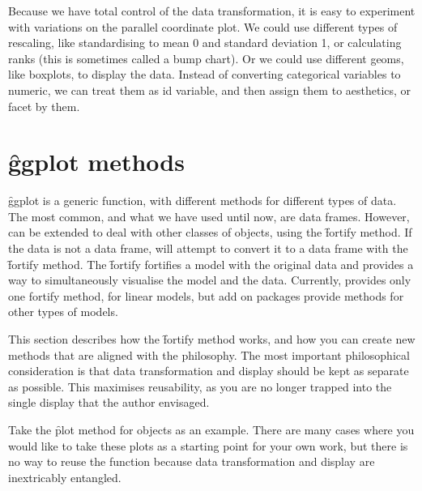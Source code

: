 % 

Because we have total control of the data transformation, it is easy to experiment with variations on the parallel coordinate plot.  We could use different types of rescaling, like standardising to mean 0 and standard deviation 1, or calculating ranks (this is sometimes called a bump chart).  Or we could use different geoms, like boxplots, to display the data.  Instead of converting categorical variables to numeric, we can treat them as id variable, and then assign them to aesthetics, or facet by them.

% 
% 



\section{\f{ggplot} methods}
\label{sec:methods}

\f{ggplot} is a generic function, with different methods for different types of data.  The most common, and what we have used until now, are data frames.  However, \ggplot can be extended to deal with other classes of objects, using the \f{fortify} method. If the data is not a data frame, \ggplot will attempt to convert it to a data frame with the \f{fortify} method.  The \f{fortify} fortifies a model with the original data and provides a way to simultaneously visualise the model and the data.  Currently, \ggplot provides only one fortify method, for linear models, but add on packages provide methods for other types of models.

This section describes how the \f{fortify} method works, and how you can create new methods that are aligned with the \ggplot philosophy.  The most important philosophical consideration is that data transformation and display should be kept as separate as possible.  This maximises reusability, as you are no longer trapped into the single display that the author envisaged.  

Take the \f{plot} method for  objects as an example.  There are many cases where you would like to take these plots as a starting point for your own work, but there is no way to reuse the function because data transformation and display are inextricably entangled.

